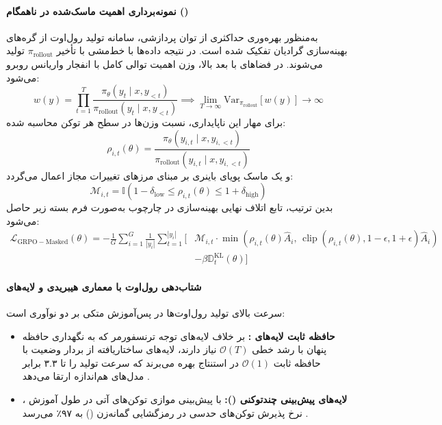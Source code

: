 \paragraph*{نمونه‌برداری اهمیت ماسک‌شده در  ناهمگام ()}
به‌منظور بهره‌وری حداکثری از توان پردازشی، سامانه تولید رول‌اوت از گره‌های بهینه‌سازی گرادیان تفکیک شده است. در نتیجه داده‌ها با خط‌مشی با تأخیر $\pi_{\text{rollout}}$ تولید می‌شوند. در فضاهای با بعد بالا، وزن اهمیت توالی کامل با انفجار واریانس روبرو می‌شود:
\begin{equation}
    w(y) = \prod_{t=1}^T \frac{\pi_\theta(y_t \mid x, y_{<t})}{\pi_{\text{rollout}}(y_t \mid x, y_{<t})} \implies \lim_{T \to \infty} \mathrm{Var}_{\pi_{\text{rollout}}}[w(y)] \to \infty
\end{equation}
برای مهار این ناپایداری، نسبت وزن‌ها در سطح هر توکن محاسبه شده:
\begin{equation}
    \rho_{i,t}(\theta) = \frac{\pi_\theta(y_{i,t} \mid x, y_{i,<t})}{\pi_{\text{rollout}}(y_{i,t} \mid x, y_{i,<t})}
\end{equation}
و یک ماسک پویای باینری بر مبنای مرزهای تغییرات مجاز اعمال می‌گردد:
\begin{equation}
    \mathcal{M}_{i, t} = \mathbb{I}\left( 1 - \delta_{\text{low}} \le \rho_{i,t}(\theta) \le 1 + \delta_{\text{high}} \right)
\end{equation}
بدین ترتیب، تابع اتلاف نهایی بهینه‌سازی در چارچوب  به‌صورت فرم بسته زیر حاصل می‌شود:
\begin{equation}
\begin{aligned}
    \mathcal{L}_{\mathrm{GRPO-Masked}}(\theta) = - \frac{1}{G} \sum_{i=1}^G \frac{1}{|y_i|} \sum_{t=1}^{|y_i|} \Bigg[ & \mathcal{M}_{i, t} \cdot \min \left( \rho_{i, t}(\theta) \hat{A}_i, \, \operatorname{clip}\left(\rho_{i, t}(\theta), 1 - \epsilon, 1 + \epsilon\right) \hat{A}_i \right) \\
    & - \beta \mathbb{D}_{t}^{\mathrm{KL}}(\theta) \Bigg]
\end{aligned}
\end{equation}

\paragraph*{شتاب‌دهی رول‌اوت با معماری هیبریدی و لایه‌های }
سرعت بالای تولید رول‌اوت‌ها در پس‌آموزش  متکی بر دو نوآوری است:
\begin{itemize}
    \item \textbf{حافظه ثابت لایه‌های :} بر خلاف لایه‌های توجه ترنسفورمر که به نگهداری حافظه پنهان  با رشد خطی $\mathcal{O}(T)$ نیاز دارند، لایه‌های ساختاریافته  از بردار وضعیت با حافظه ثابت $\mathcal{O}(1)$ در استنتاج بهره می‌برند که سرعت تولید را تا ۳.۳ برابر مدل‌های هم‌اندازه ارتقا می‌دهد \cite{nemotron3_2025}.
    \item \textbf{لایه‌های پیش‌بینی چندتوکنی ():} با پیش‌بینی موازی توکن‌های آتی در طول آموزش \cite{gloeckle2024better}، نرخ پذیرش توکن‌های حدسی در رمزگشایی گمانه‌زن () به ۹۷٪ می‌رسد \cite{leviathan2023fast}.
\end{itemize}


